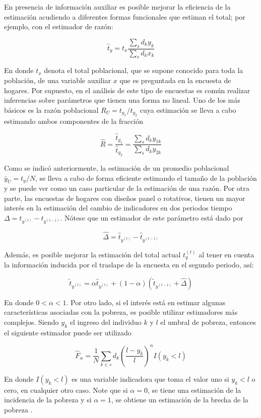 \documentclass[
  12pt,
  spanish,
]{book}
\begin{document}
En presencia de información auxiliar es posible mejorar la eficiencia de la estimación acudiendo a diferentes formas funcionales que estiman el total; por ejemplo, con el estimador de razón:

\[
\hat{t}_y = t_x \frac{\sum_s d_k y_k}{\sum_s d_k x_k}
\]

En donde \(t_x\) denota el total poblacional, que se supone conocido para toda la población, de una variable auxiliar \(x\) que es preguntada en la encuesta de hogares. Por supuesto, en el análisis de este tipo de encuestas es común realizar inferencias sobre parámetros que tienen una forma no lineal. Uno de los más básicos es la razón poblacional \(R_U = t_{y_1} / t_{y_2}\) cuya estimación se lleva a cabo estimando ambos componentes de la fracción

\[
\hat{R}= \frac{\hat{t}_{y_1}}{\hat{t}_{y_2}}
= \frac{\sum_s d_k y_{1k}} {\sum_s d_k y_{2k}}
\]

Como se indicó anteriormente, la estimación de un promedio poblacional \(\bar{y}_U = t_y / N\), se lleva a cabo de forma eficiente estimando el tamaño de la población y se puede ver como un caso particular de la estimación de una razón. Por otra parte, las encuestas de hogares con diseños panel o rotativos, tienen un mayor interés en la estimación del cambio de indicadores en dos periodos tiempo \(\Delta = t_{y^{(t)}} - t_{y^{(t-1)}}\). Nótese que un estimador de este parámetro está dado por

\[
\hat{\Delta} = \hat{t}_{y^{(t)}} - \hat{t}_{y^{(t-1)}}
\]

Además, es posible mejorar la estimación del total actual \(t_y^{(t)}\) al tener en cuenta la información inducida por el traslape de la encuesta en el segundo periodo, así:

\[
\tilde{t}_{y^{(t)}} = \alpha \hat{t}_{y^{(t)}} 
+ (1 -\alpha) (\tilde{t}_{y^{(t-1)}} + \hat{\Delta})
\]

En donde \(0 < \alpha < 1\). Por otro lado, si el interés está en estimar algunas características asociadas con la pobreza, es posible utilizar estimadores más complejos. Siendo \(y_k\) el ingreso del individuo \(k\) y \(l\) el umbral de pobreza, entonces el siguiente estimador puede ser utilizado

\[
\hat{F}_{\alpha}=\frac{1}{N}\sum_{k\in s} d_k 
\left(\frac{l-y_k}{l}\right)^{\alpha}I(y_k<l)
\]

En donde \(I(y_k<l)\) es una variable indicadora que toma el valor uno si \(y_k<l\) o cero, en cualquier otro caso. Note que si \(\alpha = 0\), se tiene una estimación de la incidencia de la pobreza y si \(\alpha = 1\), se obtiene un estimación de la brecha de la pobreza \citep{Foster_Greer_Thorbecke_1984}.
\end{document}
